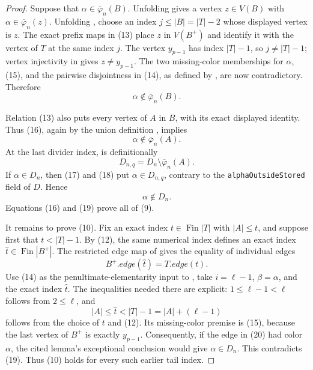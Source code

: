 \begin{proof}
Suppose that \(\alpha\in\overline\varphi_n(B)\).  Unfolding
 gives a vertex \(z\in V(B)\) with
\(\alpha\in\overline\varphi_n(z)\).  Unfolding
, choose an index \(j\leq|B|=|T|-2\)
whose displayed vertex is \(z\).  The exact prefix maps in (13) place
\(z\) in \(V(B^+)\) and identify it with the vertex of \(T\) at the same
index \(j\).  The vertex \(y_{p-1}\) has index \(|T|-1\), so
\(j\ne |T|-1\); vertex injectivity in  gives
\(z\ne y_{p-1}\).  The two missing-color memberships for
\(\alpha\), (15), and the pairwise disjointness in (14), as defined by
, are now contradictory.  Therefore
\[
                 \alpha\notin\overline\varphi_n(B).        \tag{16}
\]

Relation (13) also puts every vertex of \(A\) in \(B\), with its exact
displayed identity.  Thus (16), again by the union definition
, implies
\[
                 \alpha\notin\overline\varphi_n(A).        \tag{17}
\]
At the last divider index,  is
definitionally
\[
                 D_{n,q}=D_n\setminus
                    \overline\varphi_n(A).                  \tag{18}
\]
If \(\alpha\in D_n\), then (17) and (18) put \(\alpha\in D_{n,q}\),
contrary to the \texttt{alphaOutsideStored} field of \(D\).  Hence
\[
                           \alpha\notin D_n.                 \tag{19}
\]
Equations (16) and (19) prove all of (9).

It remains to prove (10).  Fix an exact index
\(t\in\operatorname{Fin}|T|\) with \(|A|\leq t\), and suppose first that
\(t<|T|-1\).  By (12), the same numerical index defines an exact index
\(\widehat t\in\operatorname{Fin}|B^+|\).  The restricted edge map of
 gives the equality of individual edges
\[
                B^+.\mathit{edge}(\widehat t)
                    =T.\mathit{edge}(t).                    \tag{20}
\]
Use (14) as the penultimate-elementarity input to
, take
\(i=\ell-1\), \(\beta=\alpha\), and the exact index \(\widehat t\).
The inequalities needed there are explicit: \(1\leq\ell-1<\ell\)
follows from \(2\leq\ell\), and
\[
       |A|\leq\widehat t<|T|-1=|A|+(\ell-1)
\]
follows from the choice of \(t\) and (12).  Its missing-color premise is
(15), because the last vertex of \(B^+\) is exactly \(y_{p-1}\).
Consequently, if the edge in (20) had color \(\alpha\), the cited lemma's
exceptional conclusion would give \(\alpha\in D_n\).  This contradicts
(19).  Thus (10) holds for every such earlier tail index.


\end{proof}
